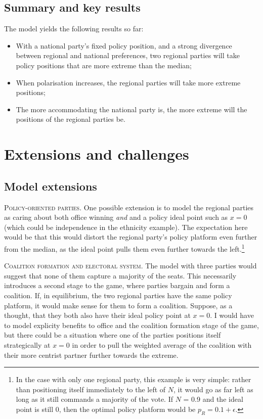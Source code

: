 \documentclass[11pt]{article}
\begin{document}
\subsection{Summary and key results}

The model yields the following results so far:
\begin{itemize}
    \item With a national party's fixed policy position, and a strong divergence between regional and national preferences, two regional parties will take policy positions that are more extreme than the median;
    \item When polarisation increases, the regional parties will take more extreme positions;
    \item The more accommodating the national party is, the more extreme will the positions of the regional parties be.
\end{itemize}



\section{Extensions and challenges}

\subsection{Model extensions}

\textsc{Policy-oriented parties.} One possible extension is to model the regional parties as caring about both office winning \textit{and} and a policy ideal point such as $x = 0$ (which could be independence in the ethnicity example). The expectation here would be that this would distort the regional party's policy platform even further from the median, as the ideal point pulls them even further towards the left.\footnote{In the case with only one regional party, this example is very simple: rather than positioning itself immediately to the left of $N$, it would go as far left as long as it still commands a majority of the vote. If $N$ = 0.9 and the ideal point is still 0, then the optimal policy platform would be $p_R = 0.1 + \epsilon$.}

\textsc{Coalition formation and electoral system.} The model with three parties would suggest that none of them capture a majority of the seats. This necessarily introduces a second stage to the game, where parties bargain and form a coalition. If, in equilibrium, the two regional parties have the same policy platform, it would make sense for them to form a coalition. Suppose, as a thought, that they both also have their ideal policy point at $x = 0$. I would have to model explicity benefits to office and the coalition formation stage of the game, but there could be a situation where one of the parties positions itself strategically at $x = 0$ in order to pull the weighted average of the coalition with their more centrist partner further towards the extreme.
\end{document}

